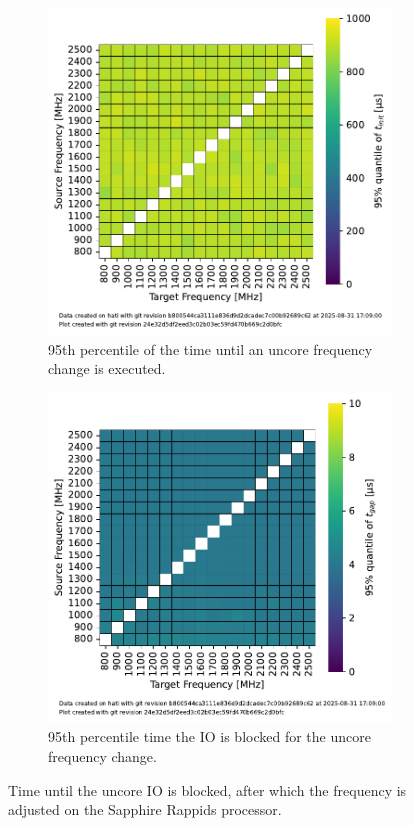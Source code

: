 \begin{figure}[]
\begin{subfigure}[t]{0.3\linewidth}
        \includegraphics[width=\linewidth]{fig/uncore-frequency-switching-latency/95percentile-t-init.pdf}
        \caption{\label{fig:b}95th percentile of the time until an uncore frequency change is executed.}
    \end{subfigure}
    \hfill
    \begin{subfigure}[t]{0.3\linewidth}
        \centering
        \includegraphics[width=\linewidth]{fig/uncore-frequency-switching-latency/95percentile-t-gap.pdf}
        \caption{\label{fig:b}95th percentile time the IO is blocked for the uncore frequency change.}
    \end{subfigure}
    \caption{\label{fig:c}Time until the uncore IO is blocked, after which the frequency is adjusted on the Sapphire Rappids processor.}
\end{figure}

